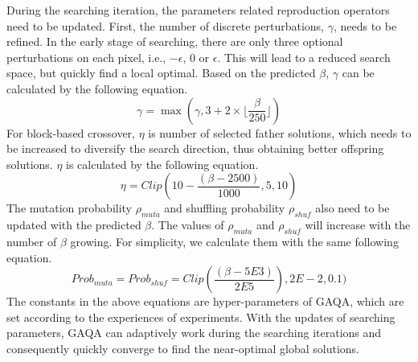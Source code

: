 \documentclass[lettersize,journal]{IEEEtran}
\begin{document}
	
	During the searching iteration, the parameters related reproduction operators need to be updated. First, the number of discrete perturbations, $\gamma$, needs to be refined. In the early stage of searching, there are only three optional perturbations on each pixel, i.e., $-\epsilon$, $0$ or $\epsilon$. This will lead to a reduced search space, but quickly find a local optimal. Based on the predicted $\beta$, $\gamma$ can be calculated by the following equation. 
	\begin{equation}
		\gamma=\max(\gamma,3+2\times \lfloor \dfrac{\beta}{250}\rfloor)
	\end{equation}
	For block-based crossover, $\eta$ is number of selected father solutions, which needs to be increased to diversify  the search direction, thus obtaining better offspring solutions. $\eta$ is calculated by the following equation.
	\begin{equation}
		\eta=Clip(10-\dfrac{(\beta-2500)}{1000},5,10)
	\end{equation}
	The mutation probability $\rho_{muta}$ and shuffling probability $\rho_{shuf}$ also need to be updated with the predicted $\beta$. The values of  $\rho_{muta}$ and $\rho_{shuf}$ will increase with the number of $\beta$ growing. For simplicity, we calculate them with the same following equation.  
	\begin{equation}
		Prob_{muta} = Prob_{shuf} =Clip(\frac{(\beta-5E3)}{2E5}),2E{-}2,0.1)
	\end{equation}
	The constants in the above equations are hyper-parameters of GAQA, which are set according to the experiences of experiments. With the updates of searching parameters, GAQA can adaptively work during the searching iterations and consequently quickly converge to find the near-optimal global solutions.
	
	
	
\end{document}
